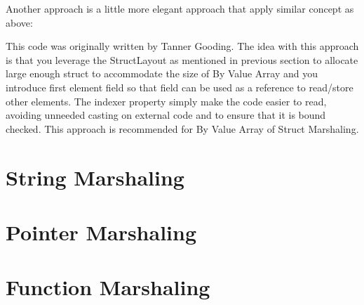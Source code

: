 
\newpage
Another approach is a little more elegant approach that apply similar concept as above:



This code was originally written by Tanner Gooding.
\newline
\newline
The idea with this approach is that you leverage the StructLayout as mentioned in previous section to allocate large enough struct to accommodate the size of By Value Array and you introduce first element field so that field can be used as a reference to read/store other elements. The indexer property simply make the code easier to read, avoiding unneeded casting on external code and to ensure that it is bound checked. This approach is recommended for By Value Array of Struct Marshaling.

\section{String Marshaling}
\section{Pointer Marshaling}

\section{Function Marshaling}

